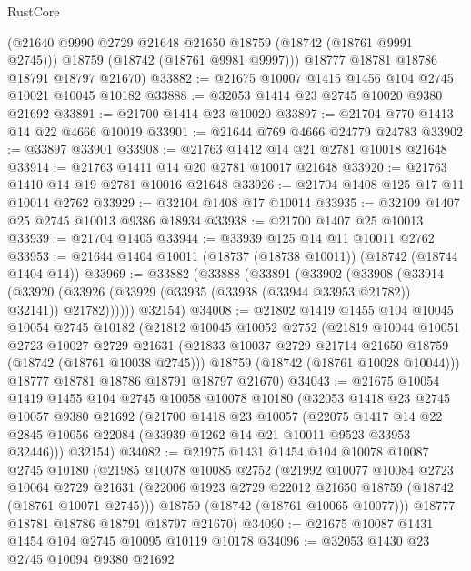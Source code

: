 \begin{lexlean}{RustCore}
\begin{coremodule}
        (@21640 @9990 @2729 @21648 @21650 @18759 (@18742 (@18761 @9991 @2745)))
        @18759
        (@18742 (@18761 @9981 @9997)))
      @18777
      @18781
      @18786
      @18791
      @18797
      @21670)
@33882 := @21675 @10007 @1415 @1456 @104 @2745 @10021 @10045 @10182
@33888 := @32053 @1414 @23 @2745 @10020 @9380 @21692
@33891 := @21700 @1414 @23 @10020
@33897 := @21704 @770 @1413 @14 @22 @4666 @10019
@33901 := @21644 @769 @4666 @24779 @24783
@33902 := @33897 @33901
@33908 := @21763 @1412 @14 @21 @2781 @10018 @21648
@33914 := @21763 @1411 @14 @20 @2781 @10017 @21648
@33920 := @21763 @1410 @14 @19 @2781 @10016 @21648
@33926 := @21704 @1408 @125 @17 @11 @10014 @2762
@33929 := @32104 @1408 @17 @10014
@33935 := @32109 @1407 @25 @2745 @10013 @9386 @18934
@33938 := @21700 @1407 @25 @10013
@33939 := @21704 @1405
@33944 := @33939 @125 @14 @11 @10011 @2762
@33953 := @21644 @1404 @10011 (@18737 (@18738 @10011)) (@18742 (@18744 @1404 @14))
@33969 := @33882
    (@33888
      (@33891
        (@33902
          (@33908
            (@33914
              (@33920 (@33926 (@33929 (@33935 (@33938 (@33944 @33953 @21782)) @32141)) @21782))))))
      @32154)
@34008 := @21802
    @1419
    @1455
    @104
    @10045
    @10054
    @2745
    @10182
    (@21812
      @10045
      @10052
      @2752
      (@21819
        @10044
        @10051
        @2723
        @10027
        @2729
        @21631
        (@21833 @10037 @2729 @21714 @21650 @18759 (@18742 (@18761 @10038 @2745)))
        @18759
        (@18742 (@18761 @10028 @10044)))
      @18777
      @18781
      @18786
      @18791
      @18797
      @21670)
@34043 := @21675
    @10054
    @1419
    @1455
    @104
    @2745
    @10058
    @10078
    @10180
    (@32053
      @1418
      @23
      @2745
      @10057
      @9380
      @21692
      (@21700
        @1418
        @23
        @10057
        (@22075
          @1417
          @14
          @22
          @2845
          @10056
          @22084
          (@33939 @1262 @14 @21 @10011 @9523 @33953 @32446)))
      @32154)
@34082 := @21975
    @1431
    @1454
    @104
    @10078
    @10087
    @2745
    @10180
    (@21985
      @10078
      @10085
      @2752
      (@21992
        @10077
        @10084
        @2723
        @10064
        @2729
        @21631
        (@22006 @1923 @2729 @22012 @21650 @18759 (@18742 (@18761 @10071 @2745)))
        @18759
        (@18742 (@18761 @10065 @10077)))
      @18777
      @18781
      @18786
      @18791
      @18797
      @21670)
@34090 := @21675 @10087 @1431 @1454 @104 @2745 @10095 @10119 @10178
@34096 := @32053 @1430 @23 @2745 @10094 @9380 @21692

\end{coremodule}
\end{lexlean}

